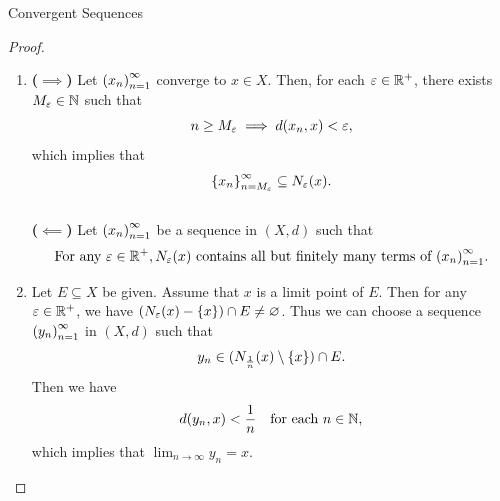 \begin{section}{Convergent Sequences}
\begin{proof}
    \begin{enumerate}[label=\textbf{(\Alph*)}]
        \item \textbf{($\implies$)} Let $\paren*{x_{n}}_{n = 1}^{\infty}$ converge to $x \in X$. Then, for each
        $\veps \in \R^{+}$, there exists $M_{\veps} \in \N$ such that
        \[
        n \geq M_{\veps} \implies d(x_{n}, x) < \veps,
        \]
        which implies that
        \[
        \set*{x_{n}}_{n = M_{\veps}}^{\infty} \subseteq N_{\veps}(x).
        \]
        \\[6mm]
        \textbf{($\impliedby$)} Let $\paren*{x_{n}}_{n = 1}^{\infty}$ be a sequence in $(X, d)$ such that
        \[
        \text{For any } \veps \in \R^{+}, N_{\veps}(x) \text{ contains all but
        finitely many terms of } \paren*{x_{n}}_{n = 1}^{\infty}.
        \]
        \item Let $E \subseteq X$ be given. Assume that $x$ is a limit point of $E$. Then for any $\veps \in
        \R^{+}$, we have $(N_{\veps}(x) - \set*{x}) \cap E \neq \vnot$. Thus we can choose a sequence
        $\paren*{y_{n}}_{n = 1}^{\infty}$ in $(X, d)$ such that
        \[
        y_{n} \in (N_{\frac{1}{n}}(x) \setminus \set*{x}) \cap E.
        \]
        Then we have
        \[
        d(y_{n}, x) < \frac{1}{n} \quad \text{for each } n \in \N,
        \]
        which implies that $\lim_{n \to \infty} y_{n} = x$.
    \end{enumerate}
\end{proof}

\end{section}